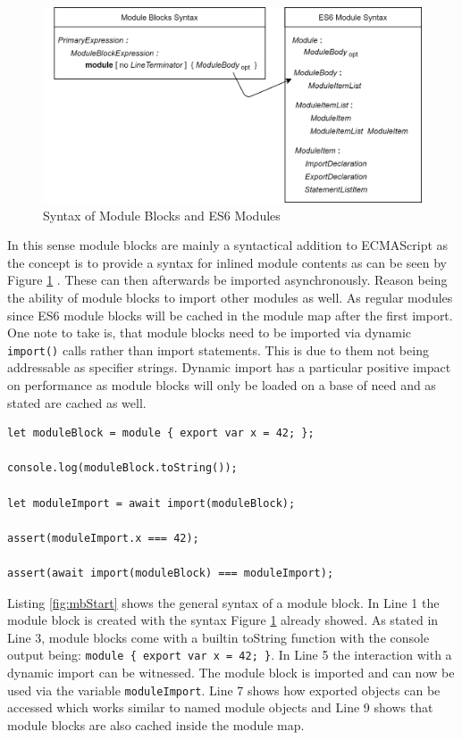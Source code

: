 \begin{figure}[h!]
    \centering
    \includegraphics[scale=0.165]{figures/ModuleSyntax.png}
    \caption{Syntax of Module Blocks and ES6 Modules}
    \label{fig:mbSyn}
\end{figure}

In this sense module blocks are mainly a syntactical addition to ECMAScript as the concept is to provide a syntax for inlined module contents as can be seen by Figure \ref{fig:mbSyn} \cite{gitMB, ecma}. These can then afterwards be imported asynchronously. Reason being the ability of module blocks to import other modules as well. As regular modules since ES6 module blocks will be cached in the module map after the first import. One note to take is, that module blocks need to be imported via dynamic \texttt{import()} calls rather than import statements. This is due to them not being addressable as specifier strings. Dynamic import  has a particular positive impact on performance as module blocks will only be loaded on a base of need and as stated are cached as well.

\begin{lstlisting}[caption={Module block example}, label={fig:mbStart}]
let moduleBlock = module { export var x = 42; };

console.log(moduleBlock.toString());

let moduleImport = await import(moduleBlock);

assert(moduleImport.x === 42);

assert(await import(moduleBlock) === moduleImport);
\end{lstlisting}

Listing \ref{fig:mbStart} shows the general syntax of a module block. In Line 1 the module block is created with the syntax Figure \ref{fig:mbSyn} already showed. As stated in Line 3, module blocks come with a builtin toString function with the console output being: \texttt{module \{ export var x = 42; \}}. In Line 5 the interaction with a dynamic import can be witnessed. The module block is imported and can now be used via the variable \texttt{moduleImport}. Line 7 shows how exported objects can be accessed which works similar to named module objects and Line 9 shows that module blocks are also cached inside the module map.
